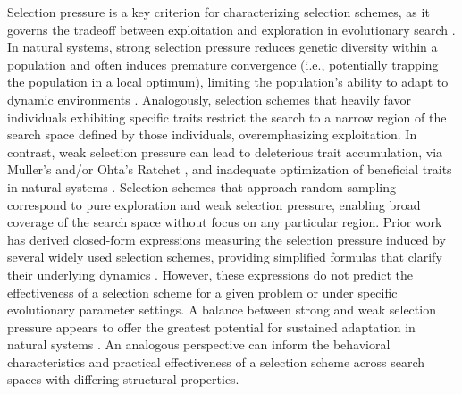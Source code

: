 Selection pressure is a key criterion for characterizing selection schemes, as it governs the tradeoff between exploitation and exploration in evolutionary search \citep{crepinsek2013exploration,eiben1998evolutionary,hernandez2023beyond}.
In natural systems, strong selection pressure reduces genetic diversity within a population and often induces premature convergence (i.e., potentially trapping the population in a local optimum), limiting the population's ability to adapt to dynamic environments \citep{fisher1930genetical,robertson1960theory}.
Analogously, selection schemes that heavily favor individuals exhibiting specific traits restrict the search to a narrow region of the search space defined by those individuals, overemphasizing exploitation.
In contrast, weak selection pressure can lead to deleterious trait accumulation, via Muller's \citep{muller1964relation, haigh1978accumulation} and/or Ohta's Ratchet \citep{ohta1973slightly, ohta1992nearly}, and inadequate optimization of beneficial traits in natural systems \citep{lynch2016genetic,lahti2009relaxed}.
Selection schemes that approach random sampling correspond to pure exploration and weak selection pressure, enabling broad coverage of the search space without focus on any particular region.
Prior work has derived closed-form expressions measuring the selection pressure induced by several widely used selection schemes, providing simplified formulas that clarify their underlying dynamics \citep{blickle1996ss,goldberg1991comparative,back1994selective,lehre2011fitnesslevels}.
However, these expressions do not predict the effectiveness of a selection scheme for a given problem or under specific evolutionary parameter settings.
A balance between strong and weak selection pressure appears to offer the greatest potential for sustained adaptation in natural systems \citep{wright1932roles}.
An analogous perspective can inform the behavioral characteristics and practical effectiveness of a selection scheme across search spaces with differing structural properties.

